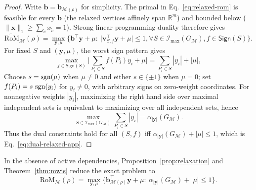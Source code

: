 \documentclass[10pt,aps,pra,twocolumn,floatfix,nofootinbib,superscriptaddress,longbibliography]{revtex4-2}
\newcommand{\R}{\mathbb R}
\newcommand{\Mcal}{\mathcal M}
\newcommand{\RoM}{\mathrm{RoM}}
\newcommand{\Ind}{\mathcal I}
\providecommand{\mathbm}[1]{\bm{#1}}
\begin{document}
\begin{bibunit}[apsrev4-2]
		\begin{proof}
			Write $\mathbm{b}=\mathbm{b}_{\Mcal(\rho)}$ for simplicity.
			The primal in Eq.~\eqref{eq:relaxed-rom} is feasible for every $\mathbm{b}$ (the relaxed vertices affinely span $\R^m$) and bounded below ($\|\mathbm{x}\|_1\ge\sum_{\tilde v}x_{\tilde v}=1$).
			Strong linear programming duality therefore gives~\cite{hamaguchi2024handbook}
			\begin{equation}
				\widetilde{\RoM}_\Mcal(\rho)
				=\max_{\mathbm{y},\mu}\Big\{\mathbm{b}^\top\mathbm{y}+\mu:\
				\big|\mathbm{v}_{S,f}^\top\mathbm{y}+\mu\big|\le 1, \forall S\in\Ind_{\max}(G_\Mcal),f\in\mathsf{Sign}(S)\Big\}.
			\end{equation}
			For fixed $S$ and $(\mathbm{y},\mu)$, the worst sign pattern gives
			\begin{equation}
				\max_{f\in\mathsf{Sign}(S)}\Big|\sum_{P_i\in S}f(P_i) y_i+\mu\Big|=\sum_{P_i\in S}|y_i|+|\mu|,
				\label{eq:relaxed-sep}
			\end{equation}
			Choose $s=\operatorname{sgn}(\mu)$ when $\mu\neq0$ and either $s\in\{\pm1\}$ when $\mu=0$; set $f(P_i)=s\,\operatorname{sgn}(y_i)$ for $y_i\neq0$, with arbitrary signs on zero-weight coordinates.
			For nonnegative weights $|y_i|$, maximizing the right hand side over maximal independent sets is equivalent to maximizing over all independent sets, hence
			\begin{equation}
				\max_{S\in\Ind_{\max}(G_\Mcal)}\sum_{P_i\in S}|y_i|=\alpha_{|\mathbm{y}|}(G_\Mcal).
			\end{equation}
			Thus the dual constraints hold for all $(S,f)$ iff $\alpha_{|\mathbm{y}|}(G_\Mcal)+|\mu|\le1$, which is Eq.~\eqref{eq:dual-relaxed-app}.
		\end{proof}
		
		In the absence of active dependencies, Proposition~\ref{prop:relaxation} and Theorem~\ref{thm:mwis} reduce the exact problem to
		\begin{equation}
			\RoM_\Mcal(\rho)=\max_{\mathbm{y},\mu}\Big\{\mathbm{b}_{\Mcal(\rho)}^\top \mathbm{y}+\mu:\ \alpha_{|\mathbm{y}|}(G_\Mcal)+|\mu|\le 1\Big\}.
			\label{eq:graph-program}
		\end{equation}
		

\end{bibunit}
\end{document}
